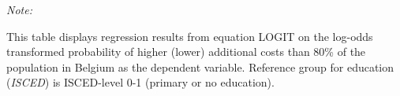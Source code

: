 \begin{table}[htbp!]
\begin{adjustbox}{width = 1\textwidth, max height = 0.95\textheight, center}
\begin{threeparttable}[b]
         \begin{tablenotes}\item \medskip \textit{Note:}
            \item This table displays regression results from equation LOGIT on the log-odds transformed probability of higher (lower) additional costs than 80\% of the population in Belgium as the dependent variable. Reference group for education (\textit{ISCED}) is ISCED-level 0-1 (primary or no education).
         \end{tablenotes}
      \end{threeparttable}
   \end{adjustbox}
\end{table}


